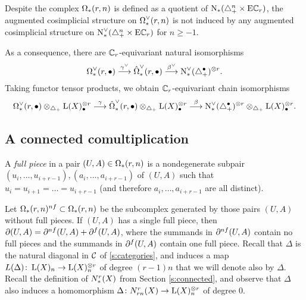 \begin{remark}
	Despite the complex $\Om(r,n)$ is defined as a quotient of $\chains(\asimplex^n\times \EC_r)$, the augmented cosimplicial structure on $\Omd(r,n)$ is not induced by any augmented cosimplicial structure on $\cochains(\asimplex^n\times \EC_r)$ for $n\geq -1$.
\end{remark}
As a consequence, there are $\Cyc_r$-equivariant natural isomorphisms
\[\Omd(r,\bullet)\overset{\gamma^\dd}{\lra} \Omhatd(r,\bullet)\overset{\beta^\dd}{\lra} \cochains(\asimplex^\bullet)^{ \ot  r}.\]
Taking functor tensor products, we obtain $\Cyc_r$-equivariant chain isomorphisms
\[\Omd(r,\bullet) \ot _{\asimplex} \rA(X)_\bullet^{ \ot  r}\overset{\gamma}{\lra} \Omhatd(r,\bullet) \ot _{\asimplex} \rA(X)_\bullet^{ \ot  r}\overset{\beta}{\lra} \cochains(\asimplex^\bullet)^{ \ot  r} \ot _{\asimplex} \rA(X)_\bullet^{ \ot  r}.\]




\subsection{A connected comultiplication}\label{s:mainresult} A \emph{full piece} in a pair $(U,A)\in \Om(r,n)$ is a nondegenerate subpair $(u_i,\ldots,u_{i+r-1}),(a_i,\ldots,a_{i+r-1})$ of $(U,A)$ such that $u_i = u_{i+1} = \ldots = u_{i+r-1}$ (and therefore $a_i,\ldots,a_{i+r-1}$ are all distinct).

Let $\Om(r,n)^{\nf}\subset \Om(r,n)$ be the subcomplex generated by those pairs $(U,A)$ without full pieces. If $(U,A)$ has a single full piece, then $\partial(U,A) = \partial^{\nf}(U,A) + \partial^{\f}(U,A)$, where the summands in $\partial^{\nf}(U,A)$ contain no full pieces and the summands in $\partial^{\f}(U,A)$ contain one full piece. Recall that $\Delta$ is the natural diagonal in $\cC$ of \ref{s:categories}, and induces a map $L(\Delta) \colon  \rA(X)_n\to \rA(X)_n^{ \ot  r}$ of degree $(r-1)n$ that we will denote also by $\Delta$. Recall the definition of $\rcadenas(X)$ from Section \ref{s:connected}, and observe that $\Delta$ also induces a homomorphism $\Delta \colon  \rcadenas[rn](X)\to \rA(X)_n^{ \ot  r}$ of degree $0$.

\renewcommand{\Psiom}{\Psi}


